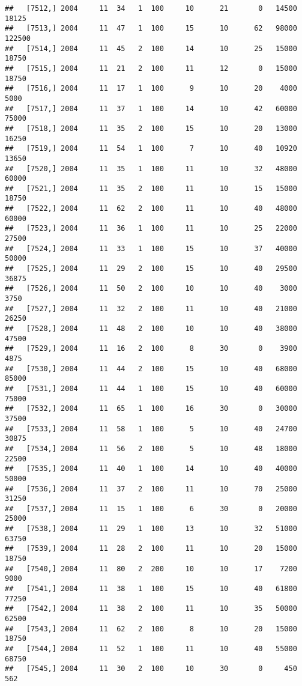 \documentclass{article}\usepackage[]{graphicx}\usepackage[]{color}
\makeatletter
\newenvironment{kframe}{%
 \def\at@end@of@kframe{}%
 \ifinner\ifhmode%
  \def\at@end@of@kframe{\end{minipage}}%
  \begin{minipage}{\columnwidth}%
 \fi\fi%
 \def\FrameCommand##1{\hskip\@totalleftmargin \hskip-\fboxsep
 \colorbox{shadecolor}{##1}\hskip-\fboxsep
     \hskip-\linewidth \hskip-\@totalleftmargin \hskip\columnwidth}%
 \MakeFramed {\advance\hsize-\width
   \@totalleftmargin\z@ \linewidth\hsize
   \@setminipage}}%
 {\par\unskip\endMakeFramed%
 \at@end@of@kframe}
\newenvironment{knitrout}{}{} %
\makeatother
\begin{document}
\begin{knitrout}
\begin{kframe}
\begin{verbatim}
##   [7512,] 2004     11  34   1  100     10      21       0   14500   18125
##   [7513,] 2004     11  47   1  100     15      10      62   98000  122500
##   [7514,] 2004     11  45   2  100     14      10      25   15000   18750
##   [7515,] 2004     11  21   2  100     11      12       0   15000   18750
##   [7516,] 2004     11  17   1  100      9      10      20    4000    5000
##   [7517,] 2004     11  37   1  100     14      10      42   60000   75000
##   [7518,] 2004     11  35   2  100     15      10      20   13000   16250
##   [7519,] 2004     11  54   1  100      7      10      40   10920   13650
##   [7520,] 2004     11  35   1  100     11      10      32   48000   60000
##   [7521,] 2004     11  35   2  100     11      10      15   15000   18750
##   [7522,] 2004     11  62   2  100     11      10      40   48000   60000
##   [7523,] 2004     11  36   1  100     11      10      25   22000   27500
##   [7524,] 2004     11  33   1  100     15      10      37   40000   50000
##   [7525,] 2004     11  29   2  100     15      10      40   29500   36875
##   [7526,] 2004     11  50   2  100     10      10      40    3000    3750
##   [7527,] 2004     11  32   2  100     11      10      40   21000   26250
##   [7528,] 2004     11  48   2  100     10      10      40   38000   47500
##   [7529,] 2004     11  16   2  100      8      30       0    3900    4875
##   [7530,] 2004     11  44   2  100     15      10      40   68000   85000
##   [7531,] 2004     11  44   1  100     15      10      40   60000   75000
##   [7532,] 2004     11  65   1  100     16      30       0   30000   37500
##   [7533,] 2004     11  58   1  100      5      10      40   24700   30875
##   [7534,] 2004     11  56   2  100      5      10      48   18000   22500
##   [7535,] 2004     11  40   1  100     14      10      40   40000   50000
##   [7536,] 2004     11  37   2  100     11      10      70   25000   31250
##   [7537,] 2004     11  15   1  100      6      30       0   20000   25000
##   [7538,] 2004     11  29   1  100     13      10      32   51000   63750
##   [7539,] 2004     11  28   2  100     11      10      20   15000   18750
##   [7540,] 2004     11  80   2  200     10      10      17    7200    9000
##   [7541,] 2004     11  38   1  100     15      10      40   61800   77250
##   [7542,] 2004     11  38   2  100     11      10      35   50000   62500
##   [7543,] 2004     11  62   2  100      8      10      20   15000   18750
##   [7544,] 2004     11  52   1  100     11      10      40   55000   68750
##   [7545,] 2004     11  30   2  100     10      30       0     450     562

\end{verbatim}
\end{kframe}
\end{knitrout}
\end{document}
